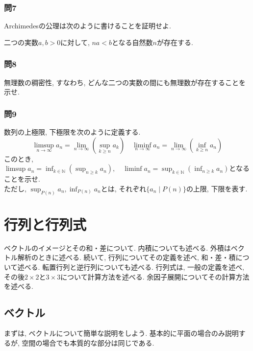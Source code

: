 \documentclass[a4j,dvipdfmx]{jsarticle}
\numberwithin{equation}{section}
\begin{document}
            \subsubsection*{問7}Archimedesの公理は次のように書けることを証明せよ.
            \begin{center}
                二つの実数$a,b>0$に対して, $na<b$となる自然数$n$が存在する.
            \end{center}

            \subsubsection*{問8}無理数の稠密性, すなわち, どんな二つの実数の間にも無理数が存在することを示せ.

            \subsubsection*{問9} 数列の上極限, 下極限を次のように定義する.
                \begin{equation}
                    \limsup_{n\to\infty} a_n = \lim_{n\to\infty}\left(\sup_{k\geq n}a_k\right) \quad \liminf_{n\to\infty} a_n=\lim_{n\to\infty}\left(\inf_{k\geq n}a_n\right) \label{eq:集合論基礎:数列のlimsup,liminf}
                \end{equation}
                このとき, $\displaystyle\limsup a_n = \inf_{k\in\mathbb{N}}\left(\sup_{n\geq k}a_n\right),\quad \liminf a_n = \sup_{k\in\mathbb{N}}\left(\inf_{n\geq k}a_n\right)$となることを示せ.\\
                ただし, $\displaystyle \sup_{P(n)} a_n,\inf_{P(n)} a_n$とは, それぞれ$\{a_n\mid P(n)\}$の上限, 下限を表す.

    \clearpage
    \section{行列と行列式}
        ベクトルのイメージとその和・差について. 内積についても述べる. 外積はベクトル解析のときに述べる. 続いて, 行列についてその定義を述べ, 和・差・積について述べる.
        転置行列と逆行列についても述べる. 行列式は, 一般の定義を述べ, その後$2\times 2$と$3\times 3$について計算方法を述べる. 余因子展開についてその計算方法を述べる.
        \subsection{ベクトル}
            まずは, ベクトルについて簡単な説明をしよう. 基本的に平面の場合のみ説明するが, 空間の場合でも本質的な部分は同じである.
\end{document}
